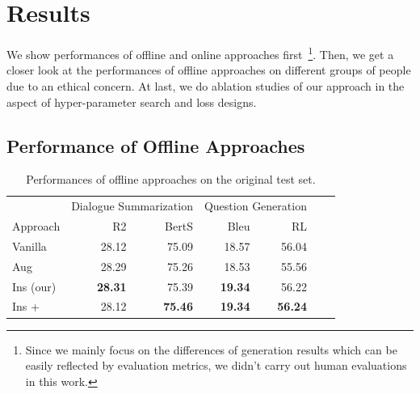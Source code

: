 \section{Results}
\label{sec:results}

We show performances of offline and online approaches first~\footnote{Since we mainly focus on the differences of generation results which can be easily reflected by evaluation metrics, we didn't carry out human evaluations in this work.}. Then, we get a closer look at the performances of offline approaches on different groups of people due to an ethical concern. At last, we do ablation studies of our approach in the aspect of hyper-parameter search and loss designs.


\subsection{Performance of Offline Approaches}
\label{sec:mda}

\begin{table}[h]
	\scriptsize
	\centering
	\begin{tabular}{lrrrrrr}
		\toprule[1pt]
		& \multicolumn{2}{l}{Dialogue Summarization} & \multicolumn{2}{c}{Question Generation} \\
		{Approach}  & {R2} & {BertS} & Bleu & RL \\
		\hline
		Vanilla & 28.12 &  75.09 & 18.57 & 56.04 \\
		Aug  & 28.29 &  75.26 & 18.53 & 55.56 \\
		Ins (our)  & \textbf{28.31} &  {75.39} & \textbf{19.34} & {56.22} \\	
		Ins + & 28.12 & \textbf{75.46} &\textbf{19.34} & \textbf{56.24}\\
		
		\bottomrule[1pt]
	\end{tabular}
	\caption{Performances of offline approaches on the original test set.}
	\label{tab:mdresults-vanilla}
\end{table}

